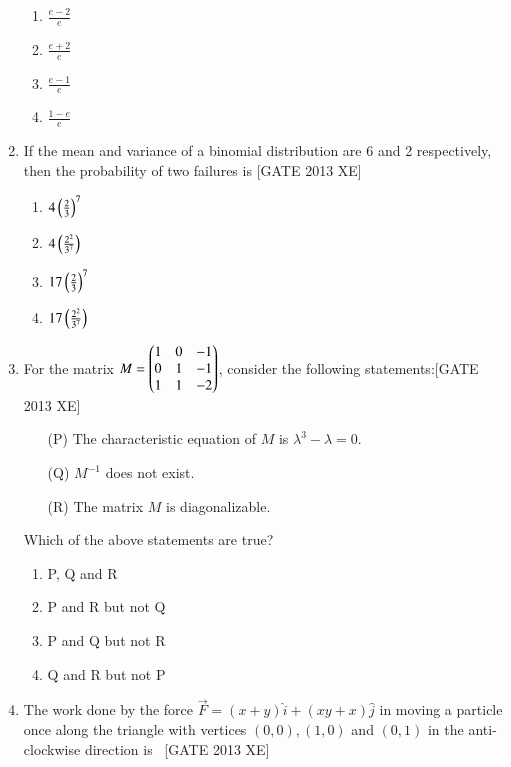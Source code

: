 \documentclass[journal,12pt,onecolumn]{IEEEtran}
\theoremstyle{remark}
\begin{document}
\begin{enumerate}
\begin{multicols}{4}
\begin{enumerate}
\item \(\frac{e-2}{e}\) 
\item \(\frac{e+2}{e}\) 
\item \(\frac{e-1}{e}\) 
\item \(\frac{1-e}{e}\)
\end{enumerate}
\end{multicols}

\item If the mean and variance of a binomial distribution are 6 and 2 respectively, then the probability of two failures is \hfill[GATE 2013 XE]

\begin{multicols}{4}
\begin{enumerate}

\item $4 \left(\frac{2}{3}\right)^{7}$
    \item $4 \left(\frac{2^{2}}{3^{7}}\right)$
    \item $17 \left(\frac{2}{3}\right)^{7}$
    \item $17 \left(\frac{2^{2}}{3^{7}}\right)$
\end{enumerate}
\end{multicols}
\item For the matrix $M = \begin{pmatrix}1 & 0 & -1 \\ 0 & 1 & -1 \\ 1 & 1 & -2\end{pmatrix}$, consider the following statements:\hfill[GATE 2013 XE]

\begin{itemize}
    \item[(P)] The characteristic equation of $M$ is $\lambda^{3} - \lambda = 0$.
    \item[(Q)] $M^{-1}$ does not exist.
    \item[(R)] The matrix $M$ is diagonalizable.
\end{itemize}

Which of the above statements are true?

\begin{multicols}{2}
\begin{enumerate}
    \item P, Q and R
    \item P and R but not Q
    \item P and Q but not R
    \item Q and R but not P
\end{enumerate}
\end{multicols}
\item The work done by the force
$
\vec{F} = (x + y) \hat{i} + (xy + x) \hat{j}
$
in moving a particle once along the triangle with vertices $(0,0), (1,0)$ and $(0,1)$ in the anti-clockwise direction is \ \hfill[GATE 2013 XE]


\end{enumerate}
\end{document}
